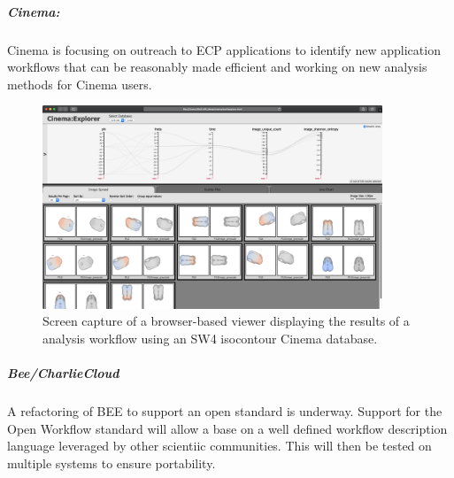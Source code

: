 \subparagraph{Cinema:}
Cinema is focusing on outreach to ECP applications to identify new application workflows that can be reasonably made efficient and working on new analysis methods for Cinema users.

\begin{figure}[htb]
	\centering
	\includegraphics[width=4in]{projects/2.3.6-NNSA/2.3.6.01-LANL-ATDM/cinema-sw4-example.png}
	\caption{
		Screen capture of a browser-based viewer displaying the results of a analysis workflow using an SW4 isocontour Cinema database.  
	\label{fig:cinema-sw4example}
	}
\end{figure}

\subparagraph{Bee/CharlieCloud}
A refactoring of BEE to support an open standard is underway. Support for the Open Workflow standard will allow a base on a well defined workflow description language leveraged by other scientiic communities. This will then be tested on multiple systems to ensure portability.
